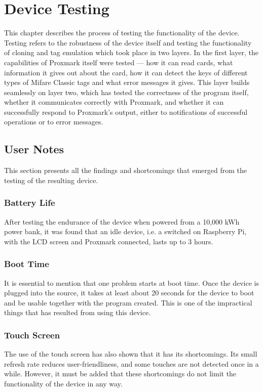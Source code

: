 \chapter{Device Testing}

This chapter describes the process of testing the functionality of the device. Testing refers to the robustness of the device itself and testing the functionality of cloning and tag emulation which took place in two layers. In the first layer, the capabilities of Proxmark itself were tested --- how it can read cards, what information it gives out about the card, how it can detect the keys of different types of Mifare Classic tags and what error messages it gives. This layer builds seamlessly on layer two, which has tested the correctness of the program itself, whether it communicates correctly with Proxmark, and whether it can successfully respond to Proxmark's output, either to notifications of successful operations or to error messages. 


\section{User Notes}

This section presents all the findings and shortcomings that emerged from the testing of the resulting device.

\subsection{Battery Life}
After testing the endurance of the device when powered from a 10,000 kWh power bank, it was found that an idle device, i.e. a switched on Raspberry Pi, with the LCD screen and Proxmark connected, lasts up to 3 hours.

\subsection{Boot Time}
It is essential to mention that one problem starts at boot time. Once the device is plugged into the source, it takes at least about 20 seconds for the device to boot and be usable together with the program created. This is one of the impractical things that has resulted from using this device.

\subsection{Touch Screen}

The use of the touch screen has also shown that it has its shortcomings. Its small refresh rate reduces user-friendliness, and some touches are not detected once in a while. However, it must be added that these shortcomings do not limit the functionality of the device in any way.

